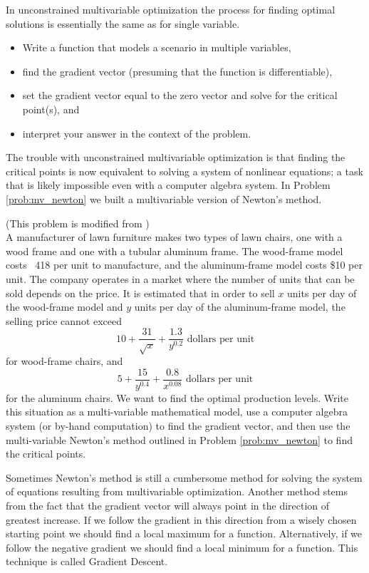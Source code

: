 In unconstrained multivariable optimization the process for finding optimal solutions is
essentially the same as for single variable.
\begin{itemize}
    \item Write a function that models a scenario in multiple variables,
    \item find the gradient vector (presuming that the function is differentiable),
    \item set the gradient vector equal to the zero vector and solve for the critical point(s), and
    \item interpret your answer in the context of the problem.
\end{itemize}
The trouble with unconstrained multivariable optimization is that finding the critical
points is now equivalent to solving a system of nonlinear equations; a task that is likely
impossible even with a computer algebra system.  In Problem \ref{prob:mv_newton} we built
a multivariable version of Newton's method.  


\begin{problem}\label{prob:lawn_chair}
    (This problem is modified from \cite{Meerschaert}) \\
    A manufacturer of lawn furniture makes two types of lawn chairs, one with a wood
    frame and one with a tubular aluminum frame.  The wood-frame model costs \
    418 per unit to manufacture, and the aluminum-frame model costs \$10 per unit.  The
    company operates in a market where the number of units that can be sold depends on the
    price.  It is estimated that in order to sell $x$ units per day of the wood-frame
    model and $y$ units per day of the aluminum-frame model, the selling price cannot
    exceed 
    \[ 10 + \frac{31}{\sqrt{x}} + \frac{1.3}{y^{0.2}} \text{ dollars per unit} \]
    for wood-frame chairs, and 
    \[ 5 + \frac{15}{y^{0.4}} + \frac{0.8}{x^{0.08}} \text{ dollars per unit} \]
    for the aluminum chairs.  We want to find the optimal production levels.  Write this
    situation as a multi-variable mathematical model, use a computer
    algebra system (or by-hand computation) to find the gradient vector, and then use the
    multi-variable Newton's method outlined in Problem \ref{prob:mv_newton} to find the critical points.
\end{problem}

Sometimes Newton's method is still a cumbersome method for solving the system of equations
resulting from multivariable optimization.  Another method stems from the fact that the
gradient vector will always point in the direction of greatest increase.  If we follow the
gradient in this direction from a wisely chosen starting point we should find a local
maximum for a function.  Alternatively, if we follow the negative gradient we should find
a local minimum for a function.  This technique is called Gradient Descent.  

